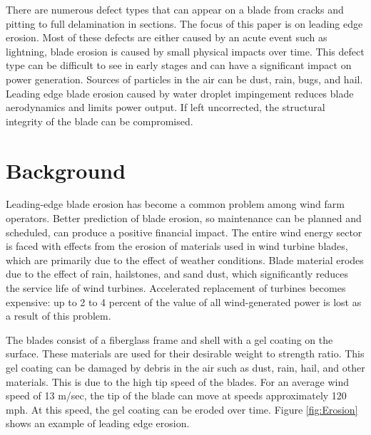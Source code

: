 \documentclass[runningheads]{llncs}
\begin{document}
There are numerous defect types that can appear on a blade from cracks and pitting to full delamination in sections. The focus of this paper is on leading edge erosion. Most of these defects are either caused by an acute event such as lightning, blade erosion is caused by small physical impacts over time. This defect type can be difficult to see in early stages and can have a significant impact on power generation. Sources of particles in the air can be dust, rain, bugs, and hail. Leading edge blade erosion caused by water droplet impingement reduces blade aerodynamics and limits power output. If left uncorrected, the structural integrity of the blade can be compromised.


\section{Background} 

Leading-edge blade erosion has become a common problem among wind farm operators. Better prediction of blade erosion, so maintenance can be planned and scheduled, can produce a positive financial impact\cite{windpower}. The entire wind energy sector is faced with effects from the erosion of materials used in wind turbine blades, which are primarily due to the effect of weather conditions\cite{VTT}. Blade material erodes due to the effect of rain, hailstones, and sand dust, which significantly reduces the service life of wind turbines. Accelerated replacement of turbines becomes expensive: up to 2 to 4 percent of the value of all wind-generated power is lost as a result of this problem\cite{VTT}.

The blades consist of a fiberglass frame and shell with a gel coating on the surface. These materials are used for their desirable weight to strength ratio. This gel coating can be damaged by debris in the air such as dust, rain, hail, and other materials. This is due to the high tip speed of the blades. For an average wind speed of 13 m/sec, the tip of the blade can move at speeds approximately 120 mph. At this speed, the gel coating can be eroded over time. Figure \ref{fig:Erosion} shows an example of leading edge erosion.
\end{document}
